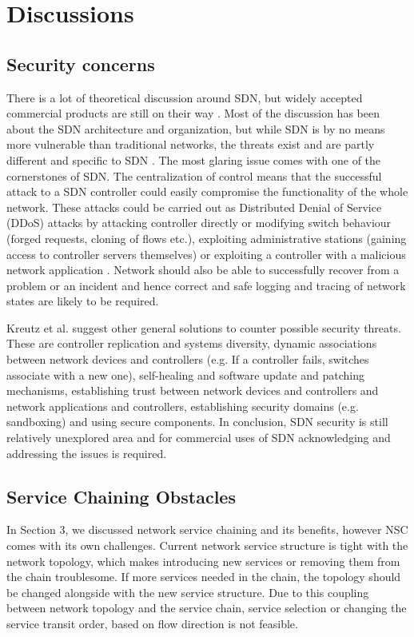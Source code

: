 \section{Discussions}

\subsection{Security concerns}

There is a lot of theoretical discussion around SDN, but widely accepted commercial products are still on their way \cite{Sorensen12}. Most of the discussion has been about the SDN architecture and organization, but while SDN is by no means more vulnerable than traditional networks, the threats exist and are partly different and specific to SDN \cite{Kreutz13}. The most glaring issue comes with one of the cornerstones of SDN. The centralization of control means that the successful attack to a SDN controller could easily compromise the functionality of the whole network. These attacks could be carried out as Distributed Denial of Service (DDoS) attacks by attacking controller directly or modifying switch behaviour (forged requests, cloning of flows etc.), exploiting administrative stations (gaining access to controller servers themselves) or exploiting a controller with a malicious network application  \cite{Kreutz13}. Network should also be able to successfully recover from a problem or an incident and hence correct and safe logging and tracing of network states are likely to be required.

Kreutz et al. suggest other general solutions to counter possible security threats. These are controller replication and systems diversity, dynamic associations between network devices and controllers (e.g. If a controller fails, switches associate with a new one), self-healing and software update and patching mechanisms, establishing trust between network devices and controllers and network applications and controllers, establishing security domains (e.g. sandboxing) and using secure components. In conclusion, SDN security is still relatively unexplored area and for commercial uses of SDN acknowledging and addressing the issues is required.

\subsection{Service Chaining Obstacles}

In Section 3, we discussed network service chaining and its benefits, however NSC comes with its own challenges. Current network service structure is tight with the network topology, which makes introducing new services or removing them from the chain troublesome. If more services needed in the chain, the topology should be changed alongside with the new service structure. Due to this coupling between network topology and the service chain, service selection or changing the service transit order, based on flow direction is not feasible. \cite{QN14}


